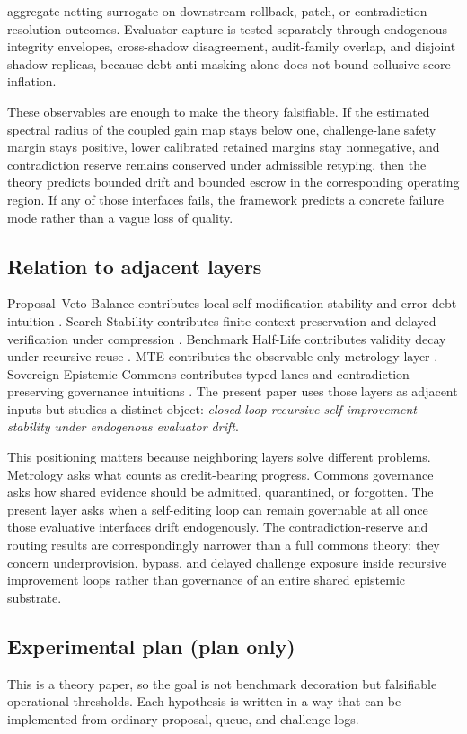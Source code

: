 \documentclass[11pt]{article}
\theoremstyle{definition}
\newcommand{\1}{\mathbf{1}}
\begin{document}
aggregate netting surrogate on downstream rollback, patch, or contradiction-resolution outcomes. Evaluator capture is tested separately through endogenous integrity envelopes, cross-shadow disagreement, audit-family overlap, and disjoint shadow replicas, because debt anti-masking alone does not bound collusive score inflation.

These observables are enough to make the theory falsifiable. If the estimated spectral radius of the coupled gain map stays below one, challenge-lane safety margin stays positive, lower calibrated retained margins stay nonnegative, and contradiction reserve remains conserved under admissible retyping, then the theory predicts bounded drift and bounded escrow in the corresponding operating region. If any of those interfaces fails, the framework predicts a concrete failure mode rather than a vague loss of quality.
\subsection{Relation to adjacent layers}
Proposal--Veto Balance contributes local self-modification stability and error-debt intuition \cite{TakahashiPV2026}. Search Stability contributes finite-context preservation and delayed verification under compression \cite{TakahashiSearch2026}. Benchmark Half-Life contributes validity decay under recursive reuse \cite{TakahashiBH2026}. MTE contributes the observable-only metrology layer \cite{TakahashiMTE2026}. Sovereign Epistemic Commons contributes typed lanes and contradiction-preserving governance intuitions \cite{TakahashiSEC2026}. The present paper uses those layers as adjacent inputs but studies a distinct object: \emph{closed-loop recursive self-improvement stability under endogenous evaluator drift}.

This positioning matters because neighboring layers solve different problems. Metrology asks what counts as credit-bearing progress. Commons governance asks how shared evidence should be admitted, quarantined, or forgotten. The present layer asks when a self-editing loop can remain governable at all once those evaluative interfaces drift endogenously. The contradiction-reserve and routing results are correspondingly narrower than a full commons theory: they concern underprovision, bypass, and delayed challenge exposure inside recursive improvement loops rather than governance of an entire shared epistemic substrate.

\subsection{Experimental plan (plan only)}
This is a theory paper, so the goal is not benchmark decoration but falsifiable operational thresholds. Each hypothesis is written in a way that can be implemented from ordinary proposal, queue, and challenge logs.
\end{document}
